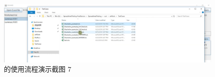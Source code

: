 \begin{figure}[tbp]    
    \centering
    \includegraphics[width=\textwidth]{figure/sg/sguard-7.png}
    \caption{\sg 的使用流程演示截图 7}
    \label{figure-sg7}
\end{figure}
